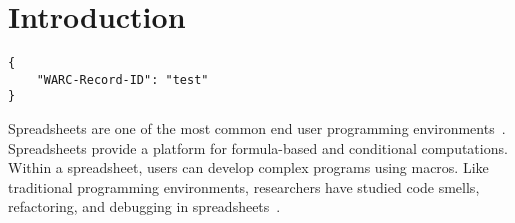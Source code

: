 \documentclass[conference]{IEEEtran}
\begin{document}


\section{Introduction}

\begin{verbatim}
{
    "WARC-Record-ID": "test"
}
\end{verbatim}


Spreadsheets are one of the most common end user programming environments~\cite{Scaffidi2005}. 
Spreadsheets provide a platform for formula-based and conditional computations. 
Within a spreadsheet, users can develop complex programs using macros. 
Like traditional programming environments, researchers have studied code smells, refactoring, and debugging in spreadsheets~\cite{Pinzger2012,Badame2012,Abraham2007}.
\end{document}
